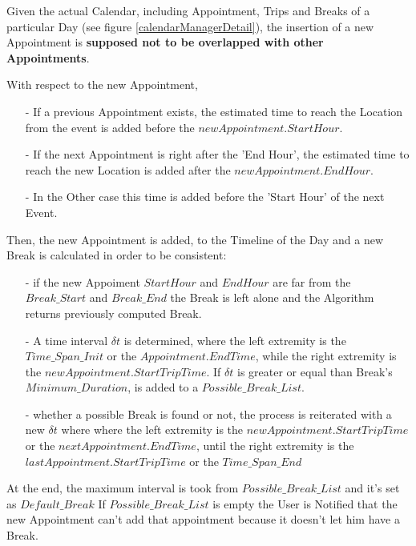 	Given the actual Calendar, including Appointment, Trips and Breaks of a particular Day (see figure \ref{calendarManagerDetail}), the insertion of a new Appointment is \textbf{supposed not to be overlapped with other Appointments}.
	
	With respect to the new Appointment, 
	\begin{itemize}
		\item[-] If a previous Appointment exists, the estimated time to reach the Location from the event is added before the $newAppointment.StartHour$.
		\item[-] If the next Appointment is right after the 'End Hour', the estimated time to reach the new Location is added after the $newAppointment.EndHour$.
		\item[-] In the Other case this time is added before the 'Start Hour' of the next Event.
	\end{itemize}
	
	Then, the new Appointment is added, to the Timeline of the Day and a new Break is calculated in order to be consistent:
	\begin{itemize}
		\item[-] if the new Appoiment $StartHour$  and $EndHour$ are far from the $Break\_Start$ and $Break\_End$ the Break is left alone and the Algorithm returns previously computed Break.
		\item[-] A time interval $\delta t$ is determined, where the left extremity is the $Time\_Span\_Init$ or the $Appointment.EndTime$, while the right extremity is the $newAppointment.StartTripTime$.
		If $\delta t$ is greater or equal than Break's $Minimum\_Duration$, is added to a $Possible\_Break\_List$.
		
		\item[-] whether a possible Break is found or not, the process is reiterated with a new $\delta t$ where where the left extremity is the $newAppointment.StartTripTime$ or the $nextAppointment.EndTime$, until the right extremity is the $lastAppointment.StartTripTime$ or the $Time\_Span\_End$
 	\end{itemize}
 	
 	At the end, the maximum interval is took from $Possible\_Break\_List$ and it's set as $Default\_Break$
 	If $Possible\_Break\_List$ is empty the User is Notified that the new Appointment can't add that appointment because it doesn't let him have a Break.
 	
 	\vfill

